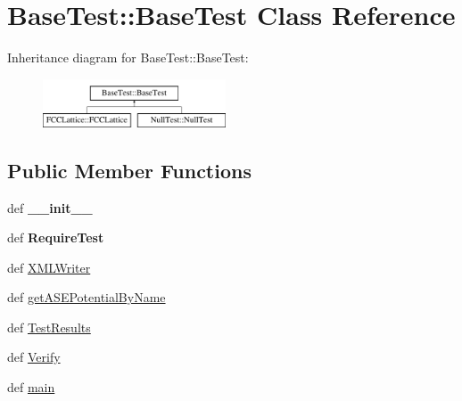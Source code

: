\hypertarget{classBaseTest_1_1BaseTest}{
\section{BaseTest::BaseTest Class Reference}
\label{classBaseTest_1_1BaseTest}
}
Inheritance diagram for BaseTest::BaseTest:\begin{figure}[H]
\begin{center}
\leavevmode
\includegraphics[height=1.428571cm]{classBaseTest_1_1BaseTest}
\end{center}
\end{figure}
\subsection*{Public Member Functions}
\begin{DoxyCompactItemize}
\item 
\hypertarget{classBaseTest_1_1BaseTest_a217c24e20c2abe8be4647faebac3e6ac}{
def {\bfseries \_\-\_\-init\_\-\_\-}}
\label{classBaseTest_1_1BaseTest_a217c24e20c2abe8be4647faebac3e6ac}

\item 
\hypertarget{classBaseTest_1_1BaseTest_af01324878b37de19b05c1badb64e730b}{
def {\bfseries RequireTest}}
\label{classBaseTest_1_1BaseTest_af01324878b37de19b05c1badb64e730b}

\item 
def \hyperlink{classBaseTest_1_1BaseTest_a1deedc89d1061da5e3afbd108af06760}{XMLWriter}
\item 
def \hyperlink{classBaseTest_1_1BaseTest_a69587478d3e6af59228e466411efb626}{getASEPotentialByName}
\item 
def \hyperlink{classBaseTest_1_1BaseTest_ad7b3f3b61fcb07c94ae62cb12f060819}{TestResults}
\item 
def \hyperlink{classBaseTest_1_1BaseTest_a1857df472a65cef53372455376136409}{Verify}
\item 
def \hyperlink{classBaseTest_1_1BaseTest_adace34a3904d856f00286217637b9914}{main}
\end{DoxyCompactItemize}
